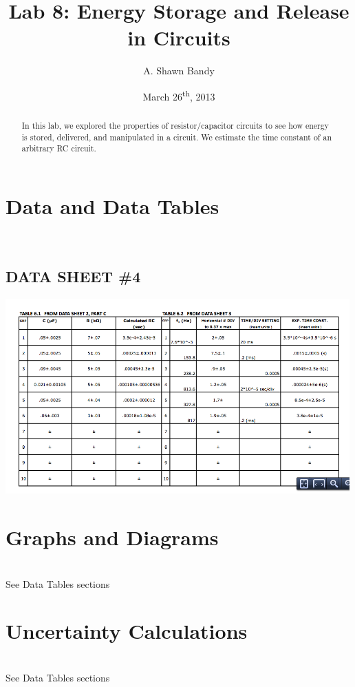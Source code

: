 \documentclass{article}
\begin{document}
\title{Lab 8:  Energy Storage and Release in Circuits}
\author{A. Shawn Bandy}
\date{March 26\textsuperscript{th}, 2013}
\maketitle
\begin{abstract}
In this lab, we explored the properties of resistor/capacitor circuits to see how energy is stored, delivered, and manipulated in a circuit.  We estimate the time constant of an arbitrary RC circuit.
\end{abstract}
\begingroup
	\section{Data and Data Tables}\hfill\\
		\let\clearpage\relax
			\begin{enumerate}[A.]
			
			
			
			\subsection{DATA SHEET \#4}
			\includegraphics[width=500px]{lab8_table1}
			\end{enumerate}
\endgroup
\begingroup
	\section{Graphs and Diagrams}\hfill\\
			See Data Tables sections\\
			

\endgroup
\begingroup
	\section{Uncertainty Calculations}\hfill\\
		\let\clearpage\relax
			See Data Tables sections\\
\endgroup
\begingroup
\end{document}
